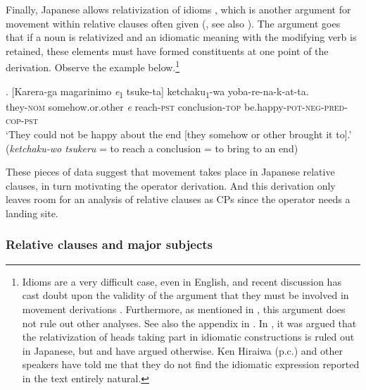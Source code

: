 \documentclass [output=book,colorlinks,citecolor=brown]{langscibook}
\begin{document}
Finally, Japanese allows relativization of idioms \citep{inoue:1976:togo, ishii:1991:operators, miyamoto:2017:RC, whitman:2013:prehead}, which is another argument for movement within relative clauses often given (\citealt{schachter:1973:focus, carlson:1977:amount}, see also \citealt{bhatt:2002:raising, bhatt:2015:rc, sauerland:2003:a, cinque:2020:relcl}). The argument goes that if a noun is relativized and an idiomatic meaning with the modifying verb is retained, these elements must have formed constituents at one point of the derivation. Observe the example below.\footnote{Idioms are a very difficult case, even in English, and recent discussion has cast doubt upon the validity of the argument that they must be involved in movement derivations \citep{heycock:2019:relative, webelhuth:2019:idioms, pankau:2020:idiomatic}. Furthermore, as mentioned in \citet[48]{bhatt:2002:raising}, this argument does not rule out other analyses. See also the appendix in \citet{cinque:2020:relcl}. In \citet{hoshi:2004:para}, it was argued that the relativization of heads taking part in idiomatic constructions is ruled out in Japanese, but \citet{inoue:1976:togo, whitman:2013:prehead} and \citet{miyamoto:2017:RC} have argued otherwise. Ken Hiraiwa (p.c.) and other speakers have told me that they do not find the idiomatic expression reported in the text entirely natural.} %

\exg. [Karera-ga magarinimo \textit{e}\textsubscript{1} tsuke-ta] ketchaku\textsubscript{1}-wa yoba-re-na-k-at-ta.\\
they-\textsc{nom} somehow.or.other \textit{e} reach-\textsc{pst} conclusion-\textsc{top} be.happy-\textsc{pot-neg-pred-cop-pst}\\
`They could not be happy about the end [they somehow or other brought it to].’ (\textit{ketchaku-wo tsukeru} = to reach a conclusion = to bring to an end) \\ \null \hfill \citep[214]{inoue:1976:togo}

These pieces of data suggest that movement takes place in Japanese relative clauses, in turn motivating the operator derivation. And this derivation only leaves room for an analysis of relative clauses as CPs since the operator needs a landing site.

\subsubsection{Relative clauses and major subjects} \label{majorsubject}
\end{document}
